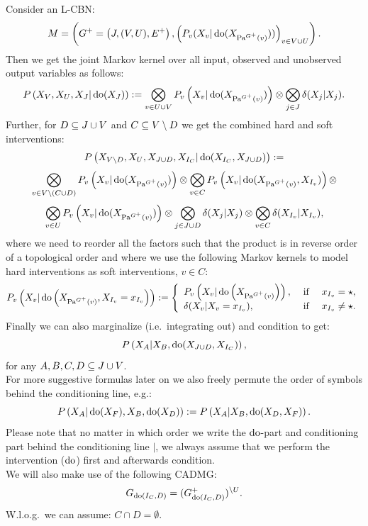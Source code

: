 \begin{Rem}[Recap]
    \label{rem-bcn-notation}
    Consider an L-CBN:
    \[M= \left ( G^+=\left ( J,(V,U),E^+ \right ), \left ( P_v ( X_v|\operatorname{do}( X_{\mathrm{Pa}^{G^+}(v)})) \right )_{v \in V \cup U} \right ).  \]
        Then we get the joint  Markov kernel over all input, observed and unobserved output variables as follows:
        \[ P\left ( X_V,X_U,X_J|\operatorname{do}(X_J) \right ) := \bigotimes_{v \in U \cup V} P_v\left ( X_v|\operatorname{do}(X_{\mathrm{Pa}^{G^+}(v)})\right ) \otimes 
        \bigotimes_{j \in J} \delta(X_j|X_j).\]
    Further, for $D \subseteq J \cup V$ and $C \subseteq V \setminus D$ we get the combined hard and soft interventions:
    \[ P\left ( X_{V \setminus D},X_U,X_{J \cup D},X_{I_C}| \operatorname{do}(X_{I_C},X_{J \cup D}) \right ) :=\] 
    \[    \bigotimes_{v \in V \setminus (C \cup D)} P_v\left ( X_v|\operatorname{do}(X_{\mathrm{Pa}^{G^+}(v)})\right ) \otimes 
    \bigotimes_{v \in C} P_v\left ( X_v|\operatorname{do}(X_{\mathrm{Pa}^{G^+}(v)},X_{I_v})\right ) \otimes \]
     \[   \bigotimes_{v \in U} P_v\left ( X_v|\operatorname{do}(X_{\mathrm{Pa}^{G^+}(v)})\right ) \otimes 
     \bigotimes_{j \in J \cup D} \delta(X_j|X_j) \otimes\bigotimes_{v \in C} \delta(X_{I_v}|X_{I_v})  ,\]
       where we need to reorder all the factors such that the product is in reverse order of a topological order and 
       where we use the following Markov kernels to model hard interventions as  soft interventions, $v\in C$: 
       \[ P_v\left ( X_v|\operatorname{do}\left ( X_{\mathrm{Pa}^{G^+}(v)},X_{I_v}=x_{I_v}\right )\right ) := 
         \left\{ \begin{array}{lll}
                 P_v\left ( X_v|\operatorname{do}\left ( X_{\mathrm{Pa}^{G^+}(v)}\right )\right ), & \text{ if } & x_{I_v} = \star, \\
    \delta(X_v|X_v =x_{I_v}),  & \text{ if } & x_{I_v} \neq \star. 
                \end{array}\right.\]
  Finally we can also marginalize (i.e.\ integrating out) and condition to get: 
  \[ P\left ( X_A|X_B, \operatorname{do}(X_{J \cup D},X_{I_C}) \right ) ,\]
for any $A,B,C,D \subseteq J \cup V$.\\
For more suggestive formulas later on we also freely permute the order of symbols behind the conditioning line, e.g.:
\[ P\left ( X_A|\operatorname{do}(X_F),X_B, \operatorname{do}(X_D) \right ) := P\left ( X_A|X_B, \operatorname{do}(X_D,X_F) \right ).\]
Please note that no matter in which order we write the $\operatorname{do}$-part and conditioning part behind the conditioning line $|$, we always assume that we perform the intervention ($\operatorname{do}$) first and afterwards condition.\\
We will also make use of the following CADMG:
\[ G_{\operatorname{do}(I_C,D)} = (G^+_{\operatorname{do}(I_C,D)})^{\setminus U}.  \]
W.l.o.g.\ we can assume: $C \cap D = \emptyset$.
\end{Rem}




